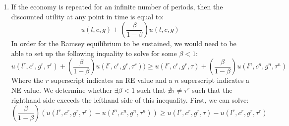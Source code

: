 \documentclass{article}
\begin{document}
\begin{enumerate}
	\item If the economy is repeated for an infinite number of periods, then the discounted utility at any point in time is equal to:
		\[
			u(l,c,g) + \left(\frac{\beta}{1-\beta}\right)u(l,c,g)
		\]
		In order for the Ramsey equilibrium to be sustained, we would need to be able to set up the following inquality to solve for some $\beta<1$:
		\[
			u(l^r,c^r,g^r,\tau^r) + \left(\frac{\beta}{1-\beta}\right)u(l^r,c^r,g^r,\tau^r))\geq 
			u(l^r,c^r,g^r,\tau) + \left(\frac{\beta}{1-\beta}\right)u(l^n,c^n,g^n,\tau^n)
		\]
		Where the $r$ superscript indicates an RE value and a $n$ superscript indicates a NE value. We determine whether $\exists\beta<1$ such that $\nexists\tau\neq\tau^r$ such that the righthand side exceeds the lefthand side of this inequality. First, we can solve:
		\[
			\left(\frac{\beta}{1-\beta}\right)\left(u(l^r,c^r,g^r,\tau^r)-u(l^n,c^n,g^n,\tau^n)\right)\geq u(l^r,c^r,g^r,\tau)-u(l^r,c^r,g^r,\tau^r)
		\]	
		
		
\end{enumerate}


\end{document}
